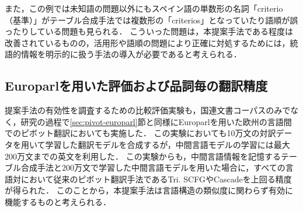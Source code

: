 \documentclass[japanese]{jnlp_1.4}
\begin{document}
また，この例では未知語の問題以外にもスペイン語の単数形の名詞「criterio （基準）」がテーブル合成手法では複数形の「criterios」となっていたり語順が誤ったりしている問題も見られる．
こういった問題は，本提案手法である程度は改善されているものの，活用形や語順の問題により正確に対処するためには，統語的情報を明示的に扱う手法の導入が必要であると考えられる．


\subsection{Europarlを用いた評価および品詞毎の翻訳精度}

提案手法の有効性を調査するための比較評価実験も，国連文書コーパスのみでなく，研究の過程で\ref{sec:pivot-europarl}節と同様にEuroparlを用いた欧州の言語間でのピボット翻訳においても実施した．
この実験においても10万文の対訳データを用いて学習した翻訳モデルを合成するが，中間言語モデルの学習には最大200万文までの英文を利用した．
この実験からも，中間言語情報を記憶するテーブル合成手法と200万文で学習した中間言語モデルを用いた場合に，すべての言語対において従来のピボット翻訳手法であるTri. SCFGやCascadeを上回る精度が得られた．
このことから，本提案手法は言語構造の類似度に関わらず有効に機能するものと考えられる．
\end{document}
